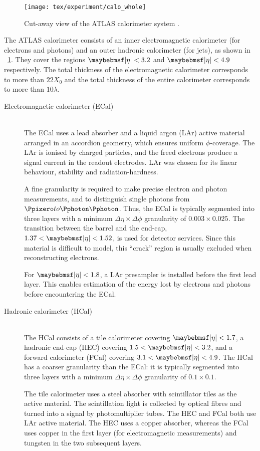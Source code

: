 \begin{figure}
	\texttt{[image: tex/experiment/calo\_whole]}
	\caption{Cut-away view of the ATLAS calorimeter system \cite{ATLAS-detector}.}
	\label{fig:calorimeters}
\end{figure}

The ATLAS calorimeter consists of an inner electromagnetic calorimeter (for electrons and 
photons) and an outer hadronic calorimeter (for jets), as shown in 
\Figure~\ref{fig:calorimeters}. They cover the regions $\mods{\eta} < 3.2$ and 
$\mods{\eta} < 4.9$ respectively. The total thickness of the electromagnetic calorimeter 
corresponds to more than $22 X_0$ and the total thickness of the entire calorimeter 
corresponds to more than $10 \lambda$.
\begin{description}
\item[Electromagnetic calorimeter (ECal)] \hfill \\
	The ECal uses a lead absorber and a liquid argon (LAr) active material arranged 
	in an accordion geometry, which ensures uniform $\phi$-coverage. The LAr is ionised 
	by charged particles, and the freed electrons produce a signal current in the readout 
	electrodes. LAr was chosen for its linear behaviour, stability and radiation-hardness.

	A fine granularity is required to make precise electron and photon measurements, and 
	to distinguish single photons from $\HepProcess{\Ppizero \HepTo \Pphoton \Pphoton}$. 
	Thus, the ECal is typically segmented into three layers with a minimum 
	$\Delta\eta\times\Delta\phi$ granularity of $0.003 \times 0.025$. The transition 
	between the barrel and the end-cap, $1.37 < \mods{\eta} < 1.52$, is used for detector 
	services. Since this material is difficult to model, this ``crack'' region is usually 
	excluded when reconstructing electrons.

	For $\mods{\eta} < 1.8$, a LAr presampler is installed before the first lead layer. 
	This enables estimation of the energy lost by electrons and photons before 
	encountering the ECal.
\item[Hadronic calorimeter (HCal)] \hfill \\
	The HCal consists of a tile calorimeter covering $\mods{\eta} < 1.7$, a hadronic 
	end-cap (HEC) covering $1.5 < \mods{\eta} < 3.2$, and a forward calorimeter (FCal) 
	covering $3.1 < \mods{\eta} < 4.9$. The HCal has a coarser granularity than the
	ECal: it is typically segmented into three layers with a minimum 
	$\Delta\eta\times\Delta\phi$ granularity of $0.1 \times 0.1$.

	The tile calorimeter uses a steel absorber with scintillator tiles as the active 
	material. The scintillation light is collected by optical fibres and turned into a 
	signal by photomultiplier tubes. The HEC and FCal both use LAr active material.
	The HEC uses a copper absorber, whereas the FCal uses copper in the first layer (for 
	electromagnetic measurements) and tungsten in the two subsequent layers.
\end{description}




